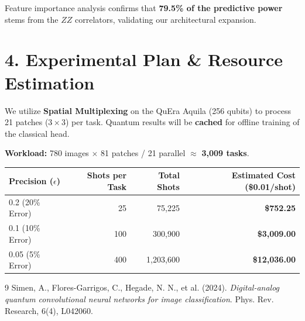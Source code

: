 \documentclass[11pt,a4paper]{article}
\begin{document}
Feature importance analysis confirms that \textbf{79.5\% of the predictive power} stems from the $ZZ$ correlators, validating our architectural expansion.

\section*{4. Experimental Plan \& Resource Estimation}
We utilize \textbf{Spatial Multiplexing} on the QuEra Aquila (256 qubits) to process 21 patches ($3\times3$) per task. Quantum results will be \textbf{cached} for offline training of the classical head.

\textbf{Workload:} 780 images $\times$ 81 patches / 21 parallel $\approx$ \textbf{3,009 tasks}.

\begin{table}[h]
    \centering
    \begin{tabular}{lrrr}
        \toprule
        Precision ($\epsilon$) & Shots per Task & Total Shots & \textbf{Estimated Cost (\$0.01/shot)} \\
        \midrule
        0.2 (20\% Error) & 25 & 75,225 & \textbf{\$752.25} \\
        0.1 (10\% Error) & 100 & 300,900 & \textbf{\$3,009.00} \\
        0.05 (5\% Error) & 400 & 1,203,600 & \textbf{\$12,036.00} \\
        \bottomrule
    \end{tabular}
\end{table}

\begin{thebibliography}{9}
Simen, A., Flores-Garrigos, C., Hegade, N. N., et al. (2024). \textit{Digital-analog quantum convolutional neural networks for image classification}. Phys. Rev. Research, 6(4), L042060.
\end{thebibliography}
\end{document}
